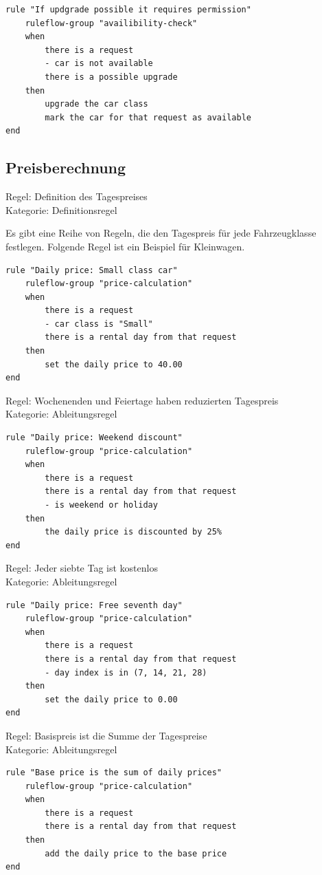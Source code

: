 \begin{lstlisting}
rule "If updgrade possible it requires permission"
	ruleflow-group "availibility-check"
	when
		there is a request
		- car is not available
		there is a possible upgrade
	then
		upgrade the car class
		mark the car for that request as available
end
\end{lstlisting}

\subsection{Preisberechnung}

Regel: Definition des Tagespreises \\
Kategorie: Definitionsregel

Es gibt eine Reihe von Regeln, die den Tagespreis für jede Fahrzeugklasse festlegen.
Folgende Regel ist ein Beispiel für Kleinwagen.

\begin{lstlisting}
rule "Daily price: Small class car" 
	ruleflow-group "price-calculation"
	when
		there is a request
		- car class is "Small"
		there is a rental day from that request
	then
		set the daily price to 40.00
end
\end{lstlisting}

Regel: Wochenenden und Feiertage haben reduzierten Tagespreis \\
Kategorie: Ableitungsregel

\begin{lstlisting}
rule "Daily price: Weekend discount"
	ruleflow-group "price-calculation"
	when
		there is a request
		there is a rental day from that request
		- is weekend or holiday
	then
		the daily price is discounted by 25%
end
\end{lstlisting}

Regel: Jeder siebte Tag ist kostenlos \\
Kategorie: Ableitungsregel

\begin{lstlisting}
rule "Daily price: Free seventh day"
	ruleflow-group "price-calculation"
	when
		there is a request
		there is a rental day from that request
		- day index is in (7, 14, 21, 28)
	then
		set the daily price to 0.00
end
\end{lstlisting}

Regel: Basispreis ist die Summe der Tagespreise \\
Kategorie: Ableitungsregel

\begin{lstlisting}
rule "Base price is the sum of daily prices"
	ruleflow-group "price-calculation"
	when
		there is a request
		there is a rental day from that request
	then
		add the daily price to the base price
end
\end{lstlisting}

